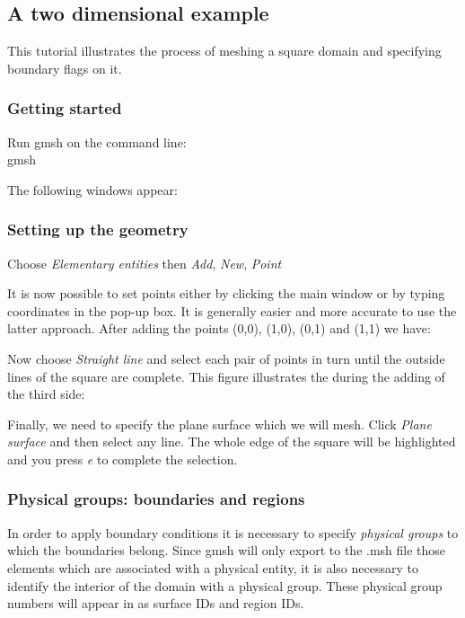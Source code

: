 \subsection{A two dimensional example}
This tutorial illustrates the process of meshing a square domain and specifying boundary flags on it.

\subsubsection{Getting started}

Run gmsh on the command line: \\

gmsh

The following windows appear: %

\subsubsection{Setting up the geometry}

Choose \textit{Elementary entities} then \textit{Add}, \textit{New},
\textit{Point}
		
It is now possible to set points either by clicking the main window or by
typing coordinates in the pop-up box. It is generally easier and more
accurate to use the latter approach. After adding the points (0,0), (1,0),
(0,1) and (1,1) we have:

Now choose \textit{Straight line} and select each pair of points in turn
until the outside lines of the square are complete. This figure illustrates
the during the adding of the third side:

Finally, we need to specify the plane surface which we will mesh. Click
\textit{Plane surface} and then select any line. The whole edge of the
square will be highlighted and you press \textit{e} to complete the
selection.

\subsubsection{Physical groups: boundaries and regions}
In order to apply boundary conditions it is necessary to specify
\textit{physical groups} to which the boundaries belong. Since gmsh will
only export to the .msh file those elements which are associated with a
physical entity, it is also necessary to identify the interior of the domain
with a physical group. These physical group numbers will appear in \fluidity
as surface IDs and region IDs. 

